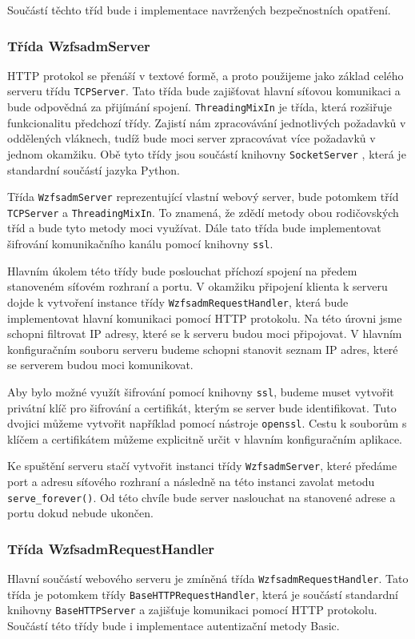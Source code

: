     Součástí těchto tříd bude i implementace navržených bezpečnostních opatření.
    \subsubsection{Třída WzfsadmServer}
    HTTP protokol se přenáší v textové formě, a proto použijeme jako základ celého serveru třídu \verb|TCPServer|. Tato třída bude zajišťovat hlavní síťovou komunikaci a bude odpovědná za přijímání spojení. \verb|ThreadingMixIn| je třída, která rozšiřuje funkcionalitu předchozí třídy. Zajistí nám zpracovávání jednotlivých požadavků v oddělených vláknech, tudíž bude moci server zpracovávat více požadavků v jednom okamžiku. Obě tyto třídy jsou součástí knihovny \verb|SocketServer| \cite{socketserver}, která je standardní součástí jazyka Python.

    Třída \verb|WzfsadmServer| reprezentující vlastní webový server, bude potomkem tříd \verb|TCPServer| a \verb|ThreadingMixIn|. To znamená, že zdědí metody obou rodičovských tříd a bude tyto metody moci využívat. Dále tato třída bude implementovat šifrování komunikačního kanálu pomocí knihovny \verb|ssl|.

    Hlavním úkolem této třídy bude poslouchat příchozí spojení na předem stanoveném síťovém rozhraní a portu. V okamžiku připojení klienta k serveru dojde k vytvoření instance třídy \verb|WzfsadmRequestHandler|, která bude implementovat hlavní komunikaci pomocí HTTP protokolu. Na této úrovni jsme schopni filtrovat IP adresy, které se k serveru budou moci připojovat. V hlavním konfiguračním souboru serveru budeme schopni stanovit seznam IP adres, které se serverem budou moci komunikovat.

    Aby bylo možné využít šifrování pomocí knihovny \verb|ssl|, budeme muset vytvořit privátní klíč pro šifrování a certifikát, kterým se server bude identifikovat. Tuto dvojici můžeme vytvořit například pomocí nástroje \verb|openssl|. Cestu k souborům s klíčem a certifikátem můžeme explicitně určit v hlavním konfiguračním aplikace.

    Ke spuštění serveru stačí vytvořit instanci třídy \verb|WzfsadmServer|, které předáme port a adresu síťového rozhraní a následně na této instanci zavolat metodu \verb|serve_forever()|. Od této chvíle bude server naslouchat na stanovené adrese a portu dokud nebude ukončen.
    \subsubsection{Třída WzfsadmRequestHandler}
    Hlavní součástí webového serveru je zmíněná třída \verb|WzfsadmRequestHandler|. Tato třída je potomkem třídy \verb|BaseHTTPRequestHandler|, která je součástí standardní knihovny \verb|BaseHTTPServer| a zajišťuje komunikaci pomocí HTTP protokolu. Součástí této třídy bude i implementace autentizační metody Basic.

